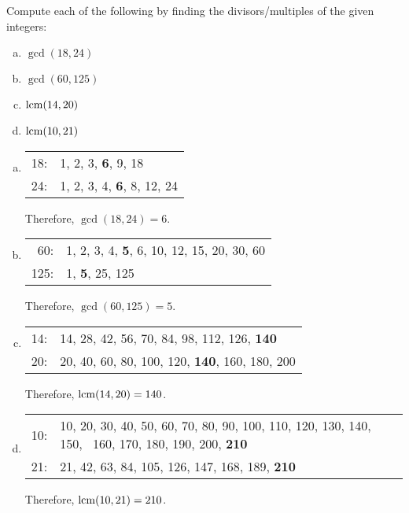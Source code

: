 \documentclass[11pt,letterpaper]{article}
\begin{document}
\newpage



 Compute each of the following by finding the divisors/multiples of the given integers:
        \begin{enumerate}[(a)]
        \item $\gcd(18, 24)$
        \item $\gcd(60, 125)$
        \item $\operatorname{lcm}(14, 20)$
        \item $\operatorname{lcm}(10, 21)$
        \end{enumerate} \pspace

\sol
\begin{enumerate}[(a)]
\item \phantom{.}\par
	\begin{table}[!ht]
	\centering
	\begin{tabular}{rl}
	18: & 1, 2, 3, \textbf{6}, 9, 18 \\
	24: & 1, 2, 3, 4, \textbf{6}, 8, 12, 24
	\end{tabular}
	\end{table} \par
Therefore, $\gcd(18, 24)= 6$. \pspace

\item \phantom{.}\par
	\begin{table}[!ht]
	\centering
	\begin{tabular}{rl}
	60: & 1, 2, 3, 4, \textbf{5}, 6, 10, 12, 15, 20, 30, 60 \\
	125: & 1, \textbf{5}, 25, 125
	\end{tabular}
	\end{table} \par
Therefore, $\gcd(60, 125)= 5$. \pspace

\item \phantom{.}\par
	\begin{table}[!ht]
	\centering
	\begin{tabular}{rl}
	14: & 14, 28, 42, 56, 70, 84, 98, 112, 126, \textbf{140} \\
	20: & 20, 40, 60, 80, 100, 120, \textbf{140}, 160, 180, 200
	\end{tabular}
	\end{table} \par
Therefore, $\operatorname{lcm}(14, 20)= 140$. \pspace

\item \phantom{.}\par
	\begin{table}[!ht]
	\centering
	\begin{tabular}{rl}
	10: & 10, 20, 30, 40, 50, 60, 70, 80, 90, 100, 110, 120, 130, 140, 150, \
160, 170, 180, 190, 200, \textbf{210} \\
	21: & 21, 42, 63, 84, 105, 126, 147, 168, 189, \textbf{210}
	\end{tabular}
	\end{table} \par
Therefore, $\operatorname{lcm}(10, 21)= 210$. \pspace
\end{enumerate}
\end{document}
